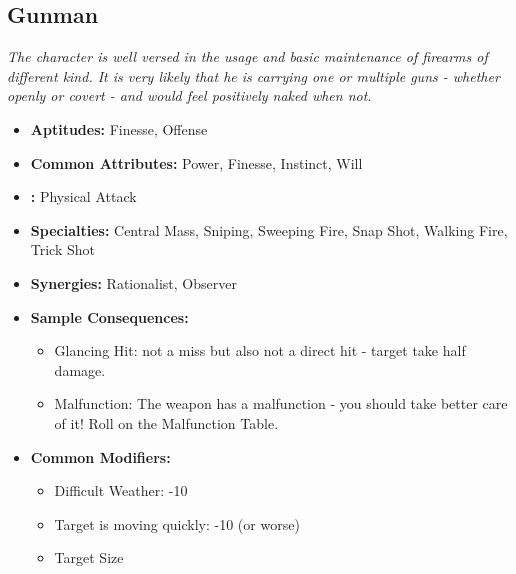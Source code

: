\subsection{Gunman}\label{Gunman}
\textit{The character is well versed in the usage and basic maintenance of firearms of different kind.
It is very likely that he is carrying one or multiple guns - whether openly or covert - and would feel positively naked when not.}
\begin{itemize}
	\item \textbf{Aptitudes:} Finesse, Offense
	\item \textbf{Common Attributes:} Power, Finesse, Instinct, Will
	\item \textbf{:} Physical Attack
	\item \textbf{Specialties:} Central Mass, Sniping, Sweeping Fire, Snap Shot, Walking Fire, Trick Shot
	\item \textbf{Synergies:} Rationalist, Observer
	\item \textbf{Sample Consequences:}
	\begin{itemize}
		\item Glancing Hit: not a miss but also not a direct hit - target take half damage.
		\item Malfunction: The weapon has a malfunction - you should take better care of it! Roll on the Malfunction Table.
	\end{itemize}
	\item \textbf{Common Modifiers:}
	\begin{itemize}
		\item Difficult Weather: -10
		\item Target is moving quickly: -10 (or worse)
		\item Target Size
	\end{itemize}
\end{itemize}

